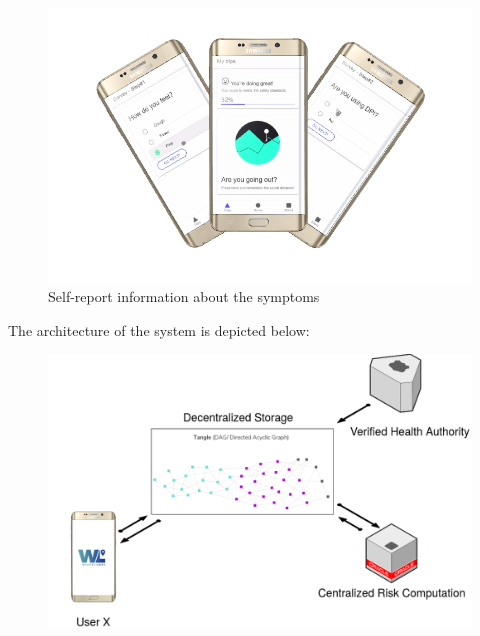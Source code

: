 \begin{figure}[H]
	\begin{center}
	    \includegraphics[scale=0.9]{imgs/phones_1.pdf}
 		\caption{Self-report information about the symptoms}
 		\label{fig:hi_low}
	\end{center}
\end{figure}



The architecture of the system is depicted below:
\begin{figure}[H]
	\begin{center}
	    \includegraphics[scale=0.3]{imgs/arch.png}
 		\caption{}
 		\label{fig:hi_low}
	\end{center}
\end{figure}

